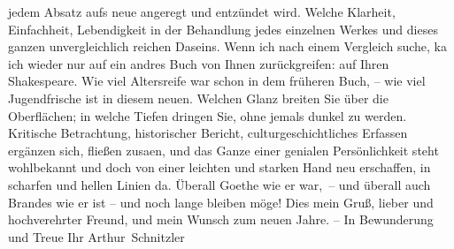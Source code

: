                jedem Absatz aufs neue angeregt und entzündet wird. Welche Klarheit, Einfachheit,
               Lebendigkeit in der Behandlung jedes einzelnen Werkes und dieses ganzen
               unvergleichlich reichen Daseins. Wenn ich nach einem Vergleich suche, ka{\geminationn} ich wieder nur auf ein andres Buch von Ihnen
               zurückgreifen: auf Ihren Shakespeare. Wie viel Altersreife war schon in dem früheren Buch, – wie viel Jugendfrische
                  \introOben{}ist\introOben{} in diesem neuen. Welchen Glanz breiten Sie über die
               Oberflächen; in welche Tiefen dringen Sie, ohne jemals dunkel zu werden. {\pb}Kritische Betrachtung, historischer Bericht,
               culturgeschichtliches Erfassen ergänzen sich, fließen zusa{\geminationm}en, und das Ganze einer genialen Persönlichkeit steht
               wohlbekannt und doch von einer leichten und starken Hand neu erschaffen, in scharfen
               und hellen Linien da. Überall Goethe wie er
               war, – und überall auch Brandes wie er ist – und noch lange bleiben möge! Dies mein
               Gruß, lieber und hochverehrter Freund, und mein Wunsch zum neuen Jahre. – In
               Bewunderung und Treue\pend
           \pstart Ihr \spacefill\mbox{Arthur Schnitzler}\pend{}\endnumbering{}  \newcommand{\dateiname}{L02372}\newcommand{\titel}{Arthur Schnitzler an Georg Brandes, 28. 12. 1921}\newcommand{\editorInnen}{Martin Anton Müller und Gerd-Hermann Susen}
